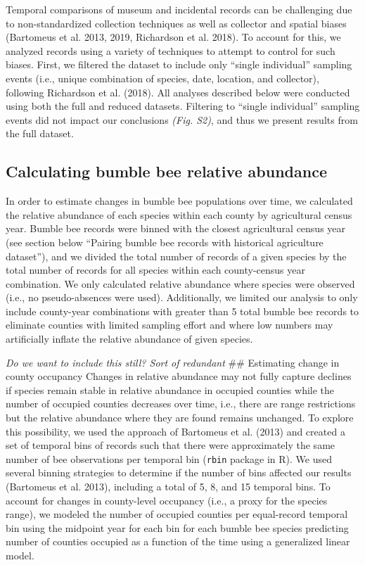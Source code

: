 \documentclass[11pt,]{article}
\begin{document}
Temporal comparisons of museum and incidental records can be challenging
due to non-standardized collection techniques as well as collector and
spatial biases (Bartomeus et al. 2013, 2019, Richardson et al. 2018). To
account for this, we analyzed records using a variety of techniques to
attempt to control for such biases. First, we filtered the dataset to
include only ``single individual'' sampling events (i.e., unique
combination of species, date, location, and collector), following
Richardson et al. (2018). All analyses described below were conducted
using both the full and reduced datasets. Filtering to ``single
individual'' sampling events did not impact our conclusions \emph{(Fig.
S2)}, and thus we present results from the full dataset.

\hypertarget{calculating-bumble-bee-relative-abundance}{%
\subsection{Calculating bumble bee relative
abundance}\label{calculating-bumble-bee-relative-abundance}}

In order to estimate changes in bumble bee populations over time, we
calculated the relative abundance of each species within each county by
agricultural census year. Bumble bee records were binned with the
closest agricultural census year (see section below ``Pairing bumble bee
records with historical agriculture dataset''), and we divided the total
number of records of a given species by the total number of records for
all species within each county-census year combination. We only
calculated relative abundance where species were observed (i.e., no
pseudo-absences were used). Additionally, we limited our analysis to
only include county-year combinations with greater than 5 total bumble
bee records to eliminate counties with limited sampling effort and where
low numbers may artificially inflate the relative abundance of given
species.

\emph{Do we want to include this still? Sort of redundant} \#\#
Estimating change in county occupancy Changes in relative abundance may
not fully capture declines if species remain stable in relative
abundance in occupied counties while the number of occupied counties
decreases over time, i.e., there are range restrictions but the relative
abundance where they are found remains unchanged. To explore this
possibility, we used the approach of Bartomeus et al. (2013) and created
a set of temporal bins of records such that there were approximately the
same number of bee observations per temporal bin (\texttt{rbin} package
in R). We used several binning strategies to determine if the number of
bins affected our results (Bartomeus et al. 2013), including a total of
5, 8, and 15 temporal bins. To account for changes in county-level
occupancy (i.e., a proxy for the species range), we modeled the number
of occupied counties per equal-record temporal bin using the midpoint
year for each bin for each bumble bee species predicting number of
counties occupied as a function of the time using a generalized linear
model.
\end{document}
